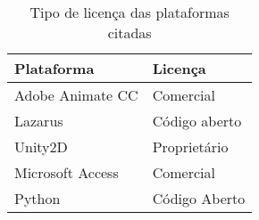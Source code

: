 



\begin{table}[!hbt] %
   \centering   %
   \setlength{\arrayrulewidth}{1\arrayrulewidth}  %
   \setlength{\belowcaptionskip}{5pt}  %
   \caption{Tipo de licença das plataformas citadas}
   \begin{tabular}{l|l} %
      \hline
      \textbf{Plataforma} & \textbf{Licença} \\
      \hline
      Adobe Animate CC & Comercial  \\
      Lazarus & Código aberto \\
      Unity2D & Proprietário \\
      Microsoft Access & Comercial \\
      Python & Código Aberto \\
      \hline
   \end{tabular}
   \label{tab:plataformas}
\end{table}






